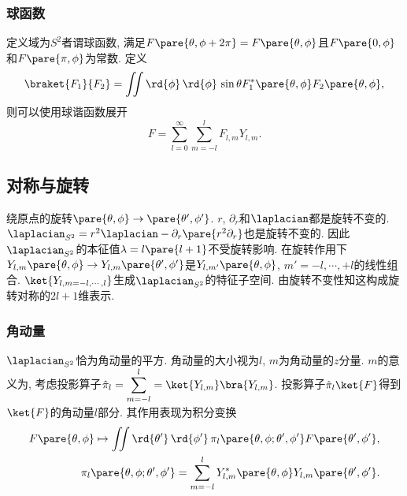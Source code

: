 \documentclass[hidelinks]{ctexart}
\begin{document}

\subsubsection{球函数} %
\label{ssub:球函数}

定义域为$S^2$者谓球函数, 满足$F\pare{\theta,\phi+2\pi} = F\pare{\theta,\phi}$且$F\pare{0,\phi}$和$F\pare{\pi,\phi}$为常数. 定义
\[ \braket{F_1}{F_2} = \iint \rd{\phi}\,\rd{\phi}\, \sin\theta F^*_1\pare{\theta,\phi} F_2\pare{\theta,\phi}, \]
则可以使用球谐函数展开
\[ F = \sum_{l=0}^\infty \sum_{m=-l}^l F_{l,m}Y_{l,m}. \]



\subsection{对称与旋转} %
\label{sub:对称与旋转}

\newpoint{}绕原点的旋转$\pare{\theta,\phi} \rightarrow \pare{\theta',\phi'}$.
\newpoint{}$r$, $\partial_r$和$\laplacian$都是旋转不变的.
\newpoint{}$\laplacian_{S^2} = r^2\laplacian - \partial_r\pare{r^2\partial_r}$也是旋转不变的.
\newpoint{}因此$\laplacian_{S^2}$的本征值$\lambda = l\pare{l+1}$不受旋转影响.
\newpoint{}在旋转作用下$Y_{l,m}\pare{\theta,\phi} \rightarrow Y_{l,m}\pare{\theta',\phi'}$是$Y_{l,m'}\pare{\theta,\phi}$, $m' = -l,\cdots,+l$的线性组合.
\newpoint{}$\ket{Y_{l,m=-l,\cdots,l}}$生成$\laplacian_{S^2}$的特征子空间.
\newpoint{}由旋转不变性知这构成旋转对称的$2l+1$维表示.

\subsubsection{角动量} %
\label{ssub:角动量}

\newpoint{}$\laplacian_{S^2}$恰为角动量的平方.
\newpoint{}角动量的大小视为$l$, $m$为角动量的$z$分量.
\newpoint{}$m$的意义为, 考虑投影算子$\displaystyle \hat \pi_l = \sum_{m=-l}^l = \ket{Y_{l,m}}\bra{Y_{l,m}}$. 投影算子$\hat \pi_l\ket{F}$得到$\ket{F}$的角动量$l$部分.
\newpoint{}其作用表现为积分变换
\begin{align*}
    F\pare{\theta,\phi} \mapsto \iint \rd{\theta'}\,\rd{\phi'}\, \pi_l\pare{\theta,\phi;\theta',\phi'} F\pare{\theta',\phi'}, \\
    \pi_l\pare{\theta,\phi;\theta',\phi'} = \sum_{m=-l}^l Y^*_{l,m}\pare{\theta,\phi}Y_{l,m}\pare{\theta',\phi'}.
\end{align*}
\end{document}
